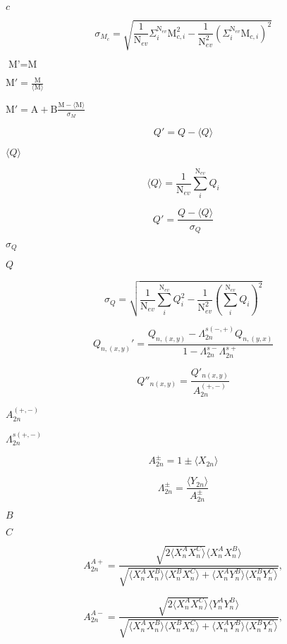\documentclass{article}
\begin{document}
$c$
\pagebreak

\[ \sigma_{{M}_{c}} = \sqrt{ \frac{1}{\mbox{N}_{ev}} \Sigma_{i}^{\mbox{N}_{ev}} \mbox{M}^2_{c,i} - \frac{1}{\mbox{N}^2_{ev}} \left(\Sigma_{i}^{\mbox{N}_{ev}} \mbox{M}_{c,i}\right)^2} \]
\pagebreak

$ \mbox{M'} = \mbox{M}$
\pagebreak

$ \mbox{M}' = \frac{\mbox{M}}{\langle\mbox{M}\rangle} $
\pagebreak

$ \mbox{M}' = \mbox{A} + \mbox{B} \frac{\mbox{M} - \langle\mbox{M} \rangle}{\sigma_{{M}}} $
\pagebreak

\[ Q' = Q - {\langle Q \rangle} \]
\pagebreak

$\langle Q \rangle$
\pagebreak

\[ \langle Q \rangle = \frac{1}{\mbox{N}_{ev}} \sum_{i}^{\mbox{N}_{ev}} Q_i \]
\pagebreak

\[ Q' = \frac{Q- \langle Q \rangle}{\sigma_Q} \]
\pagebreak

$ \sigma_Q $
\pagebreak

$ Q $
\pagebreak

\[ \sigma_Q = \sqrt{ \frac{1}{\mbox{N}_{ev}} \sum_{i}^{\mbox{N}_{ev}} Q^2_i - \frac{1}{\mbox{N}^2_{ev}} \left(\sum_{i}^{\mbox{N}_{ev}} Q_i \right)^2} \]
\pagebreak

\[ Q_{n,(x,y)}' = \frac{Q_{n,(x,y)} - \Lambda^{s(-,+)}_{2n} Q_{n,(y,x)}}{1 - \Lambda^{s-}_{2n}\Lambda^{s+}_{2n}} \]
\pagebreak

\[ Q''_{n(x,y)} = \frac{Q'_{n(x,y)}}{A_{2n}^{(+,-)}} \]
\pagebreak

$ A_{2n}^{(+,-)} $
\pagebreak

$ \Lambda^{s(+,-)}_{2n} $
\pagebreak

\[ A^{\pm}_{2n} = 1 \pm \langle X_{2n} \rangle \]
\pagebreak

\[ \Lambda ^{\pm}_{2n} = \frac{\langle Y_{2n} \rangle}{A^{\pm}_{2n}} \]
\pagebreak

$ B $
\pagebreak

$ C $
\pagebreak

\[ A^{A+}_{2n} = \frac{\sqrt{2 \langle X^{A}_{n} X^{C}_{n} \rangle}\langle X^{A}_{n} X^{B}_{n} \rangle} {\sqrt{\langle X^{A}_{n} X^{B}_{n} \rangle \langle X^{B}_{n} X^{C}_{n} \rangle + \langle X^{A}_{n} Y^{B}_{n} \rangle \langle X^{B}_{n} Y^{C}_{n} \rangle}}, \]
\pagebreak

\[ A^{A-}_{2n} = \frac{\sqrt{2 \langle X^{A}_{n} X^{C}_{n} \rangle}\langle Y^{A}_{n} Y^{B}_{n} \rangle} {\sqrt{\langle X^{A}_{n} X^{B}_{n} \rangle \langle X^{B}_{n} X^{C}_{n} \rangle + \langle X^{A}_{n} Y^{B}_{n} \rangle \langle X^{B}_{n} Y^{C}_{n} \rangle}}, \]
\pagebreak
\end{document}
